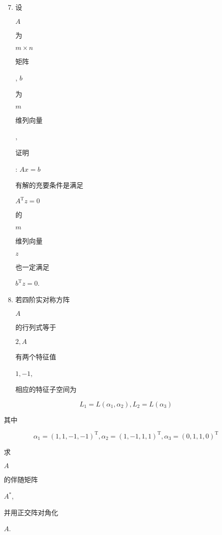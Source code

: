 \documentclass[10pt]{article}
\begin{document}
\begin{enumerate}
  \setcounter{enumi}{6}
  \item \begin{CJK}{UTF8}{mj}设\end{CJK} $A$ \begin{CJK}{UTF8}{mj}为\end{CJK} $m \times n$ \begin{CJK}{UTF8}{mj}矩阵\end{CJK}, $b$ \begin{CJK}{UTF8}{mj}为\end{CJK} $m$ \begin{CJK}{UTF8}{mj}维列向量\end{CJK}, \begin{CJK}{UTF8}{mj}证明\end{CJK}: $A x=b$ \begin{CJK}{UTF8}{mj}有解的充要条件是满足\end{CJK} $A^{\mathrm{T}} z=0$ \begin{CJK}{UTF8}{mj}的\end{CJK} $m$ \begin{CJK}{UTF8}{mj}维列向量\end{CJK} $z$ \begin{CJK}{UTF8}{mj}也一定满足\end{CJK} $b^{\mathrm{T}} z=0$.

  \item \begin{CJK}{UTF8}{mj}若四阶实对称方阵\end{CJK} $A$ \begin{CJK}{UTF8}{mj}的行列式等于\end{CJK} $2, A$ \begin{CJK}{UTF8}{mj}有两个特征值\end{CJK} $1,-1$, \begin{CJK}{UTF8}{mj}相应的特征子空间为\end{CJK}

\end{enumerate}
$$
L_{1}=L\left(\alpha_{1}, \alpha_{2}\right), L_{2}=L\left(\alpha_{3}\right)
$$
\begin{CJK}{UTF8}{mj}其中\end{CJK}
$$
\alpha_{1}=(1,1,-1,-1)^{\mathrm{T}}, \alpha_{2}=(1,-1,1,1)^{\mathrm{T}}, \alpha_{3}=(0,1,1,0)^{\mathrm{T}}
$$
\begin{CJK}{UTF8}{mj}求\end{CJK} $A$ \begin{CJK}{UTF8}{mj}的伴随矩阵\end{CJK} $A^{*}$, \begin{CJK}{UTF8}{mj}并用正交阵对角化\end{CJK} $A$.
\end{document}
